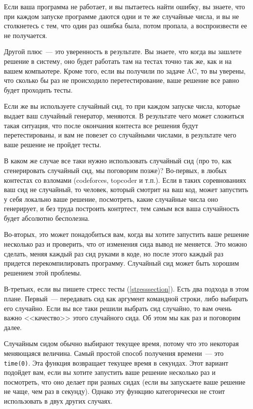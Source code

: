 Если ваша программа не работает, и вы пытаетесь найти ошибку, вы знаете, что при каждом запуске программе даются одни и те же случайные числа, и вы не столкнетесь с тем, что один раз ошибка была, потом пропала, а воспроизвести ее не получается.

Другой плюс~--- это уверенность в результате. Вы знаете, что когда вы зашлете решение в систему, оно будет работать там на тестах точно так же, как и на вашем компьютере. Кроме того, если вы получили по задаче AC, то вы уверены, что сколько бы раз не происходило перетестирование, ваше решение все равно будет проходить тесты.

Если же вы используете случайный сид, то при каждом запуске числа, которые выдает ваш случайный генератор, меняются. В результате чего может сложиться такая ситуация, что после окончания контеста все решения будут перетестированы, и вам не повезет со случайными числами, в результате чего ваше решение не пройдет тесты.

В каком же случае все таки нужно использовать случайный сид (про то, как сгенерировать случайный сид, мы поговорим позже)? Во-первых, в любых контестах со взломами (codeforces, topcoder и т.п.). Если в таких соревнованиях ваш сид не случайный, то человек, который смотрит на ваш код, может запустить у себя локально ваше решение, посмотреть, какие случайные числа оно генерирует, и без труда построить контртест, тем самым вся ваша случайность будет абсолютно бесполезна.

Во-вторых, это может понадобиться вам, когда вы хотите запустить ваше решение несколько раз и проверить, что от изменения сида вывод не меняется. Это можно сделать, меняя каждый раз сид руками в коде, но после этого каждый раз придется перекомпилировать программу. Случайный сид может быть хорошим решением этой проблемы.

В-третьих, если вы пишете стресс тесты (\ref{stresssection}). Есть два подхода в этом плане. Первый~--- передавать сид как аргумент командной строки, либо выбирать его случайно. Если вы все таки решили выбрать сид случайно, то вам очень важно <<качество>> этого случайного сида. Об этом мы как раз и поговорим далее.

Случайным сидом обычно выбирают текущее время, потому что это некоторая меняющаяся величина. Самый простой способ получения времени~--- это \verb+time(0)+. Эта функция возвращает текущее время в секундах. Этот вариант подойдет вам, если вы хотите запустить ваше решение несколько раз и посмотреть, что оно делает при разных сидах (если вы запускаете ваше решение не чаще, чем раз в секунду). Однако эту функцию категорически не стоит использовать в двух других случаях.

